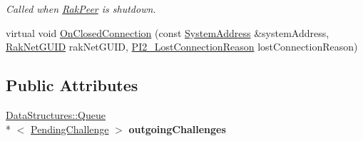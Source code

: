 \begin{DoxyCompactItemize}
\begin{DoxyCompactList}\small\item\em Called when \hyperlink{class_rak_net_1_1_rak_peer}{Rak\-Peer} is shutdown. \end{DoxyCompactList}\item 
virtual void \hyperlink{class_rak_net_1_1_two_way_authentication_ad683e107f9c25a5d833b55d547374c02}{On\-Closed\-Connection} (const \hyperlink{struct_rak_net_1_1_system_address}{System\-Address} \&system\-Address, \hyperlink{struct_rak_net_1_1_rak_net_g_u_i_d}{Rak\-Net\-G\-U\-I\-D} rak\-Net\-G\-U\-I\-D, \hyperlink{group___p_l_u_g_i_n___i_n_t_e_r_f_a_c_e___g_r_o_u_p_ga376cc546fd6892c2ead48cd51796c8b8}{P\-I2\-\_\-\-Lost\-Connection\-Reason} lost\-Connection\-Reason)
\end{DoxyCompactItemize}
\subsection*{Public Attributes}
\begin{DoxyCompactItemize}
\item 
\hypertarget{class_rak_net_1_1_two_way_authentication_a098079707e5196c783f122699f9b3a43}{\hyperlink{class_data_structures_1_1_queue}{Data\-Structures\-::\-Queue}\\*
$<$ \hyperlink{struct_rak_net_1_1_two_way_authentication_1_1_pending_challenge}{Pending\-Challenge} $>$ {\bfseries outgoing\-Challenges}}\label{class_rak_net_1_1_two_way_authentication_a098079707e5196c783f122699f9b3a43}

\end{DoxyCompactItemize}

